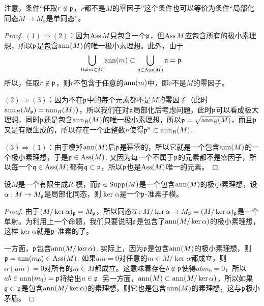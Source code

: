 注意，条件“任取$r\not\in \mathfrak{p}$，$r$都不是$M$的零因子”这个条件也可以等价为条件“局部化同态$M\to M_{\mathfrak p}$是单同态”。

\begin{proof}
$(1)\Rightarrow (2)$：因为$\operatorname{Ass} M$只包含一个$\mathfrak{p}$，但$\operatorname{Ass} M$应包含所有的极小素理想，所以$\mathfrak{p}$是包含$\operatorname{ann}(M)$的唯一极小素理想。此外，由于
\[
	\bigcup_{0\neq m\in M}\operatorname{ann}(m)\subset \bigcup_{\mathfrak{a}\in \operatorname{Ass}(M)}\mathfrak{a}=\mathfrak{p}. 
\]
所以，任取$r\not\in \mathfrak{p}$，则$r$不包含于任意的$\operatorname{ann}(m)$中，即$r$不是$M$的零因子。

$(2)\Rightarrow (3)$：因为不在$\mathfrak{p}$中的每个元素都不是$M$的零因子（此时$\operatorname{ann}_R(M_{\mathfrak{p}})=\operatorname{ann}_R(M)$），所以我们在对$\mathfrak{p}$局部化后考虑问题，此时$\mathfrak{p}$可以看成极大理想，同时$\mathfrak{p}$还是包含$\operatorname{ann}_R(M)$的唯一极小素理想，所以$\mathfrak{p}=\sqrt{\operatorname{ann}_R(M)}$，而且$\mathfrak{p}$又是有限生成的，所以存在一个正整数$n$使得$\mathfrak{p}^n\subset \operatorname{ann}_R(M)$. 

$(3)\Rightarrow (1)$：由于模掉$\operatorname{ann}(M)$后$\mathfrak{p}$是幂零的，所以它就是一个包含$\operatorname{ann}(M)$的一个极小素理想，于是$\mathfrak{p} \in \operatorname{Ass}(M)$. 又因为每一个不属于$\mathfrak{p}$的元素都不是零因子，所以每一个$\mathfrak{q}\in \operatorname{Ass}(M)$都有$\mathfrak{q}\subset \mathfrak{p}$，所以$\mathfrak{p}$也是$\operatorname{Ass}(M)$唯一的元素。
\end{proof}

\begin{pro}\label{pro:5.2.13}
	设$M$是一个有限生成$R$-模，而$\mathfrak{p}\in \operatorname{Supp}(M)$是一个包含$\operatorname{ann}(M)$的极小素理想，设$\alpha:M\to M_{\mathfrak{p}}$是局部化同态，则$\ker\alpha$是一个$\mathfrak{p}$-准素子模。
\end{pro}

\begin{proof}
	由于$(M/\ker\alpha)_{\mathfrak{p}}=M_{\mathfrak{p}}$，所以同态$\overline{\alpha}:M/\ker\alpha\to M_{\mathfrak{p}}=(M/\ker\alpha)_{\mathfrak{p}}$是一个单射。为利用上一个命题，我们只要说明$\mathfrak{p}$是包含了$\operatorname{ann}(M/\ker \alpha)$的极小素理想，这样$\ker \alpha$就是$\mathfrak{p}$-准素的了。

	一方面，$\mathfrak{p}$包含$\operatorname{ann}(M/\ker \alpha)$. 实际上，因为$\mathfrak{p}$是包含$\operatorname{ann}(M)$的极小素理想，则$\mathfrak{p}=\operatorname{ann}(m_0)\in \operatorname{Ass}(M)$. 如果$a\overline{m}=0$对任意的$m\in M/\ker \alpha$都成立，则$\alpha(am)=0$对所有的$m\in M$都成立。这意味着存在$b\not\in \mathfrak{p}$使得$abm_0=0$，所以$ab\in \operatorname{ann}(m_0)=\mathfrak{p}$将给出$a\in \mathfrak{p}$. 另一方面，$\operatorname{ann}(M)\subset \operatorname{ann}(M/\ker \alpha)$，所以如果$\mathfrak q\subset \mathfrak{p}$是包含$\operatorname{ann}(M/\ker \alpha)$的素理想，则它也是包含$\operatorname{ann}(M)$的素理想，这与$\mathfrak{p}$极小矛盾。
\end{proof}


